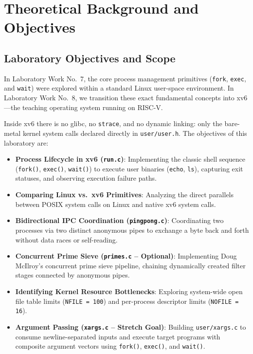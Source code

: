 \documentclass[12pt,a4paper]{article}
\begin{document}
\section{Theoretical Background and Objectives}

\subsection{Laboratory Objectives and Scope}
In Laboratory Work No.~7, the core process management primitives (\texttt{fork}, \texttt{exec}, and \texttt{wait}) were explored within a standard Linux user-space environment. In Laboratory Work No.~8, we transition these exact fundamental concepts into xv6---the teaching operating system running on RISC-V.

Inside xv6 there is no glibc, no \texttt{strace}, and no dynamic linking: only the bare-metal kernel system calls declared directly in \texttt{user/user.h}. The objectives of this laboratory are:
\begin{itemize}
    \item \textbf{Process Lifecycle in xv6 (\texttt{run.c})}: Implementing the classic shell sequence (\texttt{fork()}, \texttt{exec()}, \texttt{wait()}) to execute user binaries (\texttt{echo}, \texttt{ls}), capturing exit statuses, and observing execution failure paths.
    \item \textbf{Comparing Linux vs.~xv6 Primitives}: Analyzing the direct parallels between POSIX system calls on Linux and native xv6 system calls.
    \item \textbf{Bidirectional IPC Coordination (\texttt{pingpong.c})}: Coordinating two processes via two distinct anonymous pipes to exchange a byte back and forth without data races or self-reading.
    \item \textbf{Concurrent Prime Sieve (\texttt{primes.c} -- Optional)}: Implementing Doug McIlroy's concurrent prime sieve pipeline, chaining dynamically created filter stages connected by anonymous pipes.
    \item \textbf{Identifying Kernel Resource Bottlenecks}: Exploring system-wide open file table limits (\texttt{NFILE = 100}) and per-process descriptor limits (\texttt{NOFILE = 16}).
    \item \textbf{Argument Passing (\texttt{xargs.c} -- Stretch Goal)}: Building \texttt{user/xargs.c} to consume newline-separated inputs and execute target programs with composite argument vectors using \texttt{fork()}, \texttt{exec()}, and \texttt{wait()}.
\end{itemize}
\end{document}
